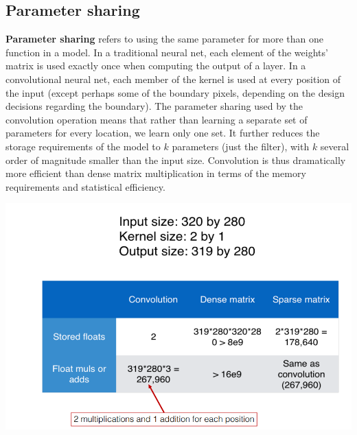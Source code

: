 \subsection{Parameter sharing}
\textbf{Parameter sharing} refers to using the same parameter for more than one function in a model. In a traditional neural net, each element of the weights' matrix is used exactly once when computing the output of a layer. In a convolutional neural net, each member of the kernel is used at every position of the input (except perhaps some of the boundary pixels, depending on the design decisions regarding the boundary). The parameter sharing used by the convolution operation means that rather than learning a separate set of parameters for every location, we learn only one set. It further reduces the storage requirements of the model to $k$ parameters (just the filter), with $k$ several order of magnitude smaller than the input size. Convolution is thus dramatically more efficient than dense matrix multiplication in terms of the memory requirements and statistical efficiency.
\begin{center}
    \includegraphics[scale=0.7]{images/conv-efficiency.png}
\end{center}

